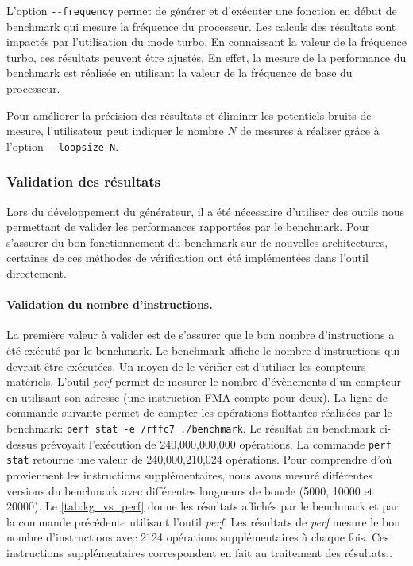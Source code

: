             L'option \verb|--frequency| permet de générer et d'exécuter une fonction en début de benchmark qui mesure la fréquence du processeur. Les calculs des résultats sont impactés par l'utilisation du mode turbo. En connaissant la valeur de la fréquence turbo, ces résultats peuvent être ajustés. En effet, la mesure de la performance du benchmark est réalisée en utilisant la valeur de la fréquence de base du processeur. 
            
            Pour améliorer la précision des résultats et éliminer les potentiels bruits de mesure, l'utilisateur peut indiquer le nombre $N$ de mesures à réaliser grâce à l'option \verb|--loopsize N|.    
    
    
    \subsubsection{Validation des résultats}
    
        Lors du développement du générateur, il a été nécessaire d'utiliser des outils nous permettant de valider les performances rapportées par le benchmark. Pour s'assurer du bon fonctionnement du benchmark sur de nouvelles architectures, certaines de ces méthodes de vérification ont été implémentées dans l'outil directement. 
        
        
        \paragraph{Validation du nombre d'instructions.} La première valeur à valider est de s'assurer que le bon nombre d'instructions a été exécuté par le benchmark. Le benchmark affiche le nombre d'instructions qui devrait être exécutées. Un moyen de le vérifier est d'utiliser les compteurs matériels. L'outil \textit{perf} permet de mesurer le nombre d'évènements d'un compteur en utilisant son adresse (une instruction FMA compte pour deux). La ligne de commande suivante permet de compter les opérations flottantes réalisées par le benchmark: \verb|perf stat -e /rffc7 ./benchmark|. Le résultat du benchmark ci-dessus prévoyait l'exécution de 240,000,000,000 opérations. La commande \verb|perf stat| retourne une valeur de 240,000,210,024 opérations. Pour comprendre d'où proviennent les instructions supplémentaires, nous avons mesuré différentes versions du benchmark avec différentes longueurs de boucle (5000, 10000 et 20000). Le \autoref{tab:kg_vs_perf} donne les résultats affichés par le benchmark et par la commande précédente utilisant l'outil \textit{perf}. Les résultats de \textit{perf} mesure le bon nombre d'instructions avec 2124 opérations supplémentaires à chaque fois. Ces instructions supplémentaires correspondent en fait au traitement des résultats..
    
